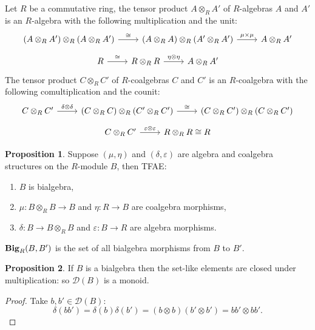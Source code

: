 \documentclass[8pt]{article}
\theoremstyle{definition}
\theoremstyle{definition}
\theoremstyle{definition}
\theoremstyle{definition}
\theoremstyle{definition}
\theoremstyle{definition}
\theoremstyle{definition}
\newtheorem{prop}{Proposition}[section]
\theoremstyle{definition}
\theoremstyle{definition}
\theoremstyle{definition}
\theoremstyle{definition}
\theoremstyle{definition}
\theoremstyle{definition}
\theoremstyle{definition}
\theoremstyle{question}
\begin{document}
Let $R$ be a commutative ring, the tensor product $A \otimes_R A'$
of $R$-algebras $A$ and $A'$ is an $R$-algebra with the following 
multiplication and the unit:
\[
\begin{tikzcd}
  (A \otimes_R A') \otimes_R (A \otimes_R A') \ar[r, "\cong"] & (A \otimes_R A) \otimes_R (A' \otimes_R A') \ar[r, "\mu \times \mu"] & A \otimes_R A'
\end{tikzcd}
\]
\[
\begin{tikzcd}
  R \ar[r, "\cong"] & R \otimes_R R \ar[r, "\eta \otimes \eta"] & A \otimes_R A' 
\end{tikzcd}
\]
The tensor product $C \otimes_R C'$ of $R$-coalgebras $C$ and $C'$ is an $R$-coalgebra
with the following comultiplication and the counit:
\[
\begin{tikzcd}
  C \otimes_R C' \ar[r, "\delta \otimes \delta"] & (C \otimes_R C) \otimes_R (C' \otimes_R C') \ar[r, "\cong"] & (C \otimes_R C') \otimes_R (C \otimes_R C') 
\end{tikzcd}
\]
\[
\begin{tikzcd}
C \otimes_R C' \ar[r, "\varepsilon \otimes \varepsilon"] & R \otimes_R R \cong R
\end{tikzcd}
\]
\begin{prop}
  Suppose $(\mu, \eta)$ and $(\delta, \varepsilon)$ are algebra and coalgebra
  structures on the $R$-module $B$, then TFAE:
  \begin{enumerate}
    \item $B$ is bialgebra,
    \item $\mu : B \otimes_R B \to B$ and $\eta : R \to B$
    are coalgebra morphisms,
    \item $\delta : B \to B \otimes_R B$ and $\varepsilon : B \to R$
    are algebra morphisms.
  \end{enumerate}
\end{prop}

${\bf Big}_R(B, B')$ is the set of all bialgebra morphisms from $B$ to $B'$.

\begin{prop}
  If $B$ is a bialgebra then the set-like elements are closed under multiplication:
  so $\mathcal{D}(B)$ is a monoid.
\end{prop}

\begin{proof}
  Take $b, b' \in \mathcal{D}(B)$:
  \[
  \delta(bb') = \delta(b)\delta(b') = (b \otimes b)(b' \otimes b') = bb' \otimes bb'.
  \]
\end{proof}
\end{document}
